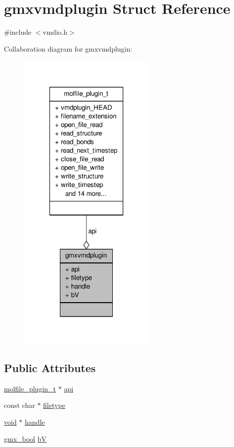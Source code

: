 \hypertarget{structgmxvmdplugin}{\section{gmxvmdplugin \-Struct \-Reference}
\label{structgmxvmdplugin}
}


{\ttfamily \#include $<$vmdio.\-h$>$}



\-Collaboration diagram for gmxvmdplugin\-:
\nopagebreak
\begin{figure}[H]
\begin{center}
\leavevmode
\includegraphics[width=190pt]{structgmxvmdplugin__coll__graph}
\end{center}
\end{figure}
\subsection*{\-Public \-Attributes}
\begin{DoxyCompactItemize}
\item 
\hyperlink{structmolfile__plugin__t}{molfile\-\_\-plugin\-\_\-t} $\ast$ \hyperlink{structgmxvmdplugin_afc0674f586c2459d1b1a7da624a02acb}{api}
\item 
const char $\ast$ \hyperlink{structgmxvmdplugin_acc8c82c77ab1b3c9cb4fc44e374520d7}{filetype}
\item 
\hyperlink{nbnxn__kernel__simd__4xn__outer_8h_a8dc3f4a797ed992dff49d2fa3477eee8}{void} $\ast$ \hyperlink{structgmxvmdplugin_a3997458d3f662d9f0ea9ed2489609189}{handle}
\item 
\hyperlink{include_2types_2simple_8h_a8fddad319f226e856400d190198d5151}{gmx\-\_\-bool} \hyperlink{structgmxvmdplugin_a32d4d38e085027cdb7798a164c7fb578}{b\-V}
\end{DoxyCompactItemize}


